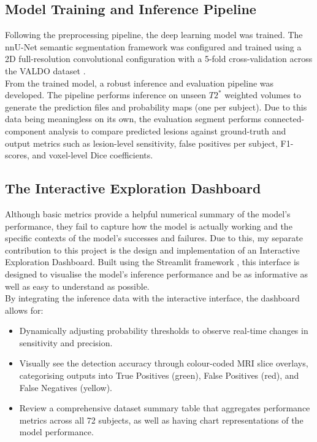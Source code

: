 \documentclass{aifyp}
\begin{document}
\subsection{Model Training and Inference Pipeline}
Following the preprocessing pipeline, the deep learning model was trained. The nnU-Net semantic segmentation framework was configured and trained using a 2D full-resolution convolutional configuration with a 5-fold cross-validation across the VALDO dataset \cite{nnUNet}.
\\

From the trained model, a robust inference and evaluation pipeline was developed. The pipeline performs inference on unseen $T2^*$ weighted volumes to generate the prediction files and probability maps (one per subject). Due to this data being meaningless on its own, the evaluation segment performs connected-component analysis to compare predicted lesions against ground-truth and output metrics such as lesion-level sensitivity, false positives per subject, F1-scores, and voxel-level Dice coefficients.


\subsection{The Interactive Exploration Dashboard}
Although basic metrics provide a helpful numerical summary of the model’s performance, they fail to capture how the model is actually working and the specific contexts of the model’s successes and failures. Due to this, my separate contribution to this project is the design and implementation of an Interactive Exploration Dashboard. Built using the Streamlit framework \cite{streamlitDdocs}, this interface is designed to visualise the model's inference performance and be as informative as well as easy to understand as possible.
\\

By integrating the inference data with the interactive interface, the dashboard allows for:
\begin{itemize}
    \item Dynamically adjusting probability thresholds to observe real-time changes in sensitivity and precision.
    \item Visually see the detection accuracy through colour-coded MRI slice overlays, categorising outputs into True Positives (green), False Positives (red), and False Negatives (yellow).
    \item Review a comprehensive dataset summary table that aggregates performance metrics across all 72 subjects, as well as having chart representations of the model performance.
\end{itemize}
\end{document}
